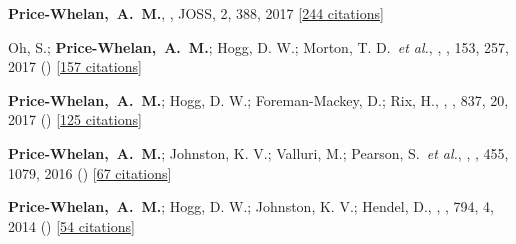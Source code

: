 \item[{\color{deemph}\scriptsize5}]\textbf{Price-Whelan,~A.~M.}, , JOSS, 2, 388, 2017 [\href{http://adsabs.harvard.edu/abs/2017JOSS....2..388P}{244 citations}]

\item[{\color{deemph}\scriptsize4}]Oh, S.; \textbf{Price-Whelan,~A.~M.}; Hogg, D. W.; Morton, T. D.~\textit{et al.}, , \aj, 153, 257, 2017 () [\href{http://adsabs.harvard.edu/abs/2017AJ....153..257O}{157 citations}]

\item[{\color{deemph}\scriptsize3}]\textbf{Price-Whelan,~A.~M.}; Hogg, D. W.; Foreman-Mackey, D.; Rix, H., , \apj, 837, 20, 2017 () [\href{http://adsabs.harvard.edu/abs/2017ApJ...837...20P}{125 citations}]

\item[{\color{deemph}\scriptsize2}]\textbf{Price-Whelan,~A.~M.}; Johnston, K. V.; Valluri, M.; Pearson, S.~\textit{et al.}, , \mnras, 455, 1079, 2016 () [\href{http://adsabs.harvard.edu/abs/2016MNRAS.455.1079P}{67 citations}]

\item[{\color{deemph}\scriptsize1}]\textbf{Price-Whelan,~A.~M.}; Hogg, D. W.; Johnston, K. V.; Hendel, D., , \apj, 794, 4, 2014 () [\href{http://adsabs.harvard.edu/abs/2014ApJ...794....4P}{54 citations}]